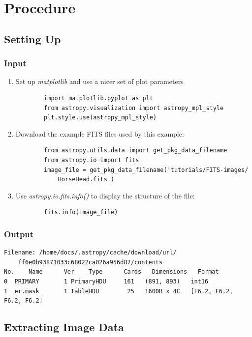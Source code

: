 \documentclass[letterpaper,11pt]{report}
\begin{document}
\section{Procedure}
\subsection{Setting Up}
\subsubsection{Input}
\begin{enumerate}
    \item Set up \emph{matplotlib} and use a nicer set of plot parameters
        \begin{lstlisting}
        import matplotlib.pyplot as plt
        from astropy.visualization import astropy_mpl_style
        plt.style.use(astropy_mpl_style)
        \end{lstlisting}
    \item Download the example FITS files used by this example:
        \begin{lstlisting}
        from astropy.utils.data import get_pkg_data_filename
        from astropy.io import fits
        image_file = get_pkg_data_filename('tutorials/FITS-images/
            HorseHead.fits')
        \end{lstlisting}
    \item Use \emph{astropy.io.fits.info()} to display the structure of the file:
        \begin{lstlisting}
        fits.info(image_file)
        \end{lstlisting}
\end{enumerate}
    
\subsubsection{ Output}
\begin{lstlisting}
Filename: /home/docs/.astropy/cache/download/url/
    ff6e0b93871033c68022ca026a956d87/contents
No.    Name      Ver    Type      Cards   Dimensions   Format
0  PRIMARY       1 PrimaryHDU     161   (891, 893)   int16 
1  er.mask       1 TableHDU        25   1600R x 4C   [F6.2, F6.2, F6.2, F6.2]
\end{lstlisting}

\subsection{Extracting Image Data}
\end{document}
